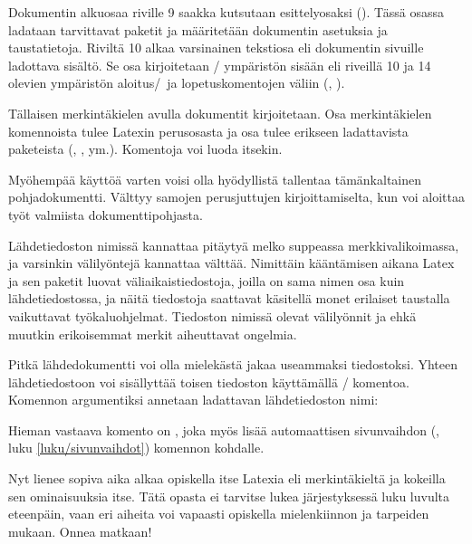 Dokumentin alkuosaa riville 9 saakka kutsutaan esittelyosaksi
(). Tässä osassa ladataan tarvittavat paketit ja
määritetään dokumentin asetuksia ja taustatietoja. Riviltä 10 alkaa
varsinainen tekstiosa eli dokumentin sivuille ladottava sisältö. Se osa
kirjoitetaan \-/ ympäristön sisään eli riveillä 10
ja 14 olevien ympäristön aloitus\-/\ ja lopetuskomentojen väliin
(, ).

Tällaisen merkintäkielen avulla dokumentit kirjoitetaan. Osa
merkintäkielen komennoista tulee Latexin perusosasta ja osa tulee
erikseen ladattavista paketeista (,
,  ym.). Komentoja voi luoda
itsekin.

Myöhempää käyttöä varten voisi olla hyödyllistä tallentaa tämänkaltainen
pohjadokumentti. Välttyy samojen perusjuttujen kirjoittamiselta, kun voi
aloittaa työt valmiista dokumenttipohjasta.

Lähdetiedoston nimissä kannattaa pitäytyä melko suppeassa
merkkivalikoimassa, ja varsinkin välilyöntejä kannattaa välttää.
Nimittäin kääntämisen aikana Latex ja sen paketit luovat
väliaikaistiedostoja, joilla on sama nimen osa kuin lähdetiedostossa, ja
näitä tiedostoja saattavat käsitellä monet erilaiset taustalla
vaikuttavat työkaluohjelmat. Tiedoston nimissä olevat välilyönnit ja
ehkä muutkin erikoisemmat merkit aiheuttavat ongelmia.

Pitkä lähdedokumentti voi olla mielekästä jakaa useammaksi tiedostoksi.
Yhteen lähdetiedostoon voi sisällyttää toisen tiedoston käyttämällä
\-/ komentoa. Komennon argumentiksi annetaan ladattavan
lähdetiedoston nimi:

\begin{koodilohkosis}

\end{koodilohkosis}

\noindent
Hieman vastaava komento on , joka myös lisää
automaattisen sivunvaihdon (, luku
\ref{luku/sivunvaihdot}) komennon kohdalle.

Nyt lienee sopiva aika alkaa opiskella itse Latexia eli merkintäkieltä
ja kokeilla sen ominaisuuksia itse. Tätä opasta ei tarvitse lukea
järjestyksessä luku luvulta eteenpäin, vaan eri aiheita voi vapaasti
opiskella mielenkiinnon ja tarpeiden mukaan. Onnea matkaan!
